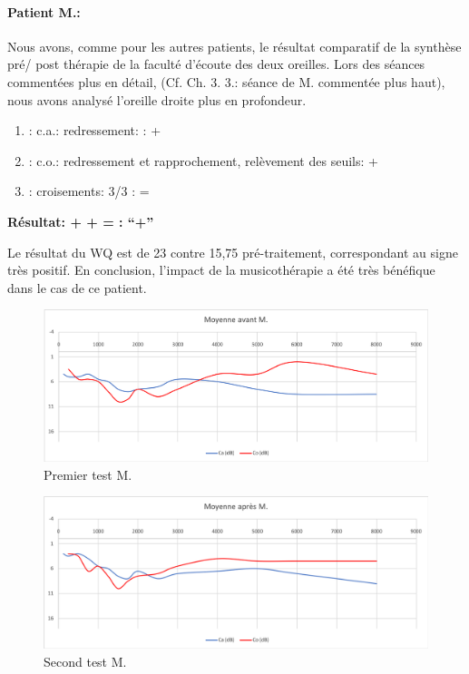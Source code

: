          \paragraph{ Patient M.:}
       
       Nous avons, comme pour les autres patients, le résultat comparatif de la synthèse pré/ post thérapie 
       de la faculté d'écoute des deux oreilles. Lors des séances commentées plus en détail, (Cf. Ch. 3. 3.: 
       séance de M. commentée plus haut), nous avons analysé l'oreille droite plus en profondeur.
	\begin{enumerate}

 		\item : c.a.: redressement: : +   %

 		\item : c.o.: redressement et rapprochement,
                  relèvement des seuils:  +     %
 		\item : croisements: 3/3 :  =

                \end{enumerate}

                \textbf{ Résultat:  +  +  =     : ``+''}
                
                
    Le résultat du WQ est de  23 contre 15,75 pré-traitement, correspondant
    au signe très positif. En conclusion, l'impact de la musicothérapie a été très bénéfique dans le cas de 
    ce patient.           

                \begin{figure}[th]
\centering
\includegraphics[width=1\linewidth]{images/graphiques/m_pre.png}

\caption[Patient M. : 1° test]{Premier test M.}

\end{figure}


                        \begin{figure}[th]
\centering
\includegraphics[width=1\linewidth]{images/graphiques/m_post.png}
\caption[Patient M. : 2° test]{Second test M.}

\end{figure}

